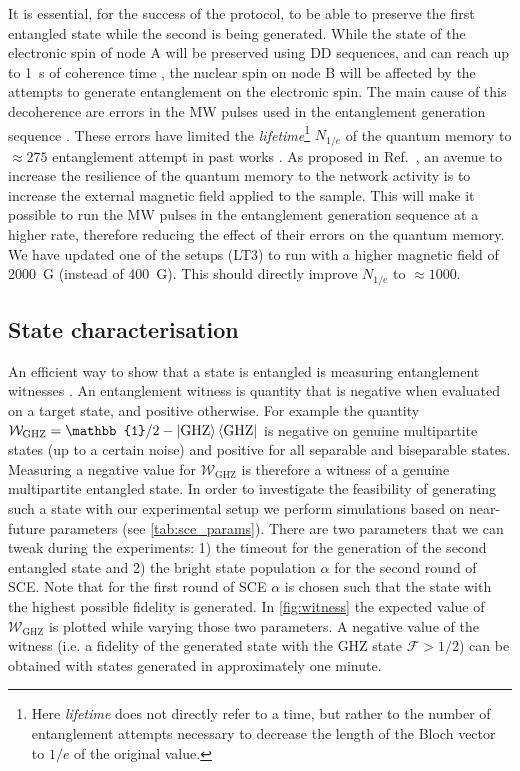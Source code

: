 \documentclass[a4paper]{article}
\begin{document}
It is essential, for the success of the protocol, to be able to preserve the first entangled state while the second is being generated. While the state of the electronic spin of node A will be preserved using \ac{DD} sequences, and can reach up to \SI{1}{s} of coherence time \cite{Abobeih2018}, the nuclear spin on node B will be affected by the attempts to generate entanglement on the electronic spin. The main cause of this decoherence are errors in the \ac{MW} pulses used in the entanglement generation sequence \cite{Kalb2018}. These errors have limited the \emph{lifetime}\footnote{Here \emph{lifetime} does not directly refer to a time, but rather to the number of entanglement attempts necessary to decrease the length of the Bloch vector to $1/e$ of the original value.} $N_{1/e}$ of the quantum memory to $\approx 275$ entanglement attempt in past works \cite{Kalb2017}. As proposed in Ref.~\cite{Kalb2018}, an avenue to increase the resilience of the quantum memory to the network activity is to increase the external magnetic field applied to the sample. This will make it possible to run the \ac{MW} pulses in the entanglement generation sequence at a higher rate, therefore reducing the effect of their errors on the quantum memory. We have updated one of the setups (LT3) to run with a higher magnetic field of \SI{2000}{G} (instead of \SI{400}{G}). This should directly improve $N_{1/e}$ to $\approx 1000$.

\subsection{State characterisation}

An efficient way to show that a state is entangled is measuring entanglement witnesses \cite{Guehne2009}. An entanglement witness is quantity that is negative when evaluated on a target state, and positive otherwise. For example the quantity $\mathcal W_\text{GHZ} = \mathbb{1}/2 - \ket{\text{GHZ}}\bra{\text{GHZ}}$ is negative on genuine multipartite states (up to a certain noise) and positive for all separable and biseparable states. Measuring a negative value for $\mathcal W_\text{GHZ}$ is therefore a witness of a genuine multipartite entangled state. In order to investigate the feasibility of generating such a state with our experimental setup we perform simulations based on near-future parameters (see \autoref{tab:sce_params}). There are two parameters that we can tweak during the experiments: 1) the timeout for the generation of the second entangled state and 2) the bright state population $\alpha$ for the second round of \ac{SCE}. Note that for the first round of \ac{SCE} $\alpha$ is chosen such that the state with the highest possible fidelity is generated. In \autoref{fig:witness} the expected value of $\mathcal W_\text{GHZ}$  is plotted while varying those two parameters. A negative value of the witness (i.e. a fidelity of the generated state with the GHZ state $\mathcal{F} > 1/2$) can be obtained with states generated in approximately one minute.
\end{document}
